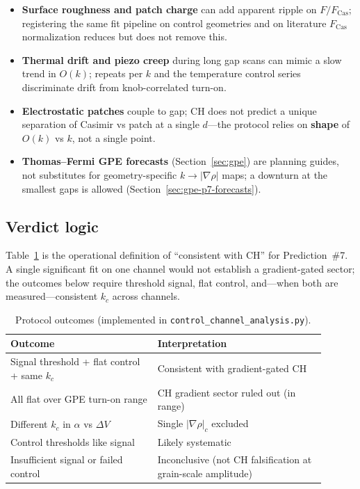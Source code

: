 \documentclass[11pt,a4paper]{article}
\begin{document}
\begin{itemize}[leftmargin=*]
  \item \textbf{Surface roughness and patch charge} can add apparent ripple on $F/F_{\mathrm{Cas}}$; registering the same fit pipeline on control geometries and on literature $F_{\mathrm{Cas}}$ normalization reduces but does not remove this.
  \item \textbf{Thermal drift and piezo creep} during long gap scans can mimic a slow trend in $O(k)$; repeats per $k$ and the temperature control series discriminate drift from knob-correlated turn-on.
  \item \textbf{Electrostatic patches} couple to gap; CH does not predict a unique separation of Casimir vs patch at a single $d$---the protocol relies on \textbf{shape} of $O(k)$ vs $k$, not a single point.
  \item \textbf{Thomas--Fermi GPE forecasts} (Section~\ref{sec:gpe}) are planning guides, not substitutes for geometry-specific $k \to |\nabla\rho|$ maps; a downturn at the smallest gaps is allowed (Section~\ref{sec:gpe-p7-forecasts}).
\end{itemize}

\subsection{Verdict logic}

Table~\ref{tab:verdict} is the operational definition of ``consistent with CH'' for Prediction~\#7.
A single significant fit on one channel would not establish a gradient-gated sector; the outcomes below require threshold signal, flat control, and---when both are measured---consistent $k_c$ across channels.

\begin{table}[htbp]
  \centering
  \caption{Protocol outcomes (implemented in \texttt{control\_channel\_analysis.py}).}
  \label{tab:verdict}
  \small
  \begin{tabular}{@{}p{0.42\linewidth}p{0.48\linewidth}@{}}
    \toprule
    Outcome & Interpretation \\
    \midrule
    Signal threshold + flat control + same $k_c$ & Consistent with gradient-gated CH \\
    All flat over GPE turn-on range & CH gradient sector ruled out (in range) \\
    Different $k_c$ in $\alpha$ vs $\Delta V$ & Single $|\nabla\rho|_c$ excluded \\
    Control thresholds like signal & Likely systematic \\
    Insufficient signal or failed control & Inconclusive (not CH falsification at grain-scale amplitude) \\
    \bottomrule
  \end{tabular}
\end{table}
\end{document}
